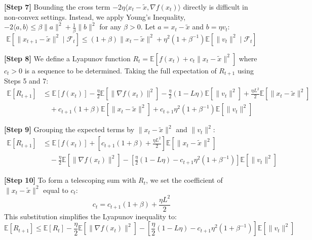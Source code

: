 \documentclass[11pt]{article}
\begin{document}
\textbf{[Step 7]} Bounding the cross term $-2\eta \langle x_t - \tilde{x}, \nabla f(x_t) \rangle$ directly is difficult in non-convex settings. Instead, we apply Young's Inequality, $-2\langle a, b \rangle \le \beta \|a\|^2 + \frac{1}{\beta} \|b\|^2$ for any $\beta > 0$. Let $a = x_t - \tilde{x}$ and $b = \eta v_t$:
\begin{equation} \tag{Step 7}
    \mathbb{E}[\|x_{t+1} - \tilde{x}\|^2 \mid \mathcal{F}_t] \le (1 + \beta) \|x_t - \tilde{x}\|^2 + \eta^2 (1 + \beta^{-1}) \mathbb{E}[\|v_t\|^2 \mid \mathcal{F}_t]
\end{equation}

\textbf{[Step 8]} We define a Lyapunov function $R_t = \mathbb{E}[f(x_t) + c_t \|x_t - \tilde{x}\|^2]$ where $c_t > 0$ is a sequence to be determined. Taking the full expectation of $R_{t+1}$ using Steps 5 and 7:
\begin{align} 
    \mathbb{E}[R_{t+1}] &\le \mathbb{E}[f(x_t)] - \frac{\eta}{2} \mathbb{E}[\|\nabla f(x_t)\|^2] - \frac{\eta}{2}(1 - L\eta) \mathbb{E}[\|v_t\|^2] + \frac{\eta L^2}{2} \mathbb{E}[\|x_t - \tilde{x}\|^2] \nonumber \\
    &\quad + c_{t+1}(1 + \beta) \mathbb{E}[\|x_t - \tilde{x}\|^2] + c_{t+1}\eta^2 (1 + \beta^{-1}) \mathbb{E}[\|v_t\|^2] \tag{Step 8}
\end{align}

\textbf{[Step 9]} Grouping the expected terms by $\|x_t - \tilde{x}\|^2$ and $\|v_t\|^2$:
\begin{align} 
    \mathbb{E}[R_{t+1}] &\le \mathbb{E}[f(x_t)] + \left[ c_{t+1}(1 + \beta) + \frac{\eta L^2}{2} \right] \mathbb{E}[\|x_t - \tilde{x}\|^2] \nonumber \\
    &\quad - \frac{\eta}{2} \mathbb{E}[\|\nabla f(x_t)\|^2] - \left[ \frac{\eta}{2}(1 - L\eta) - c_{t+1}\eta^2(1 + \beta^{-1}) \right] \mathbb{E}[\|v_t\|^2] \tag{Step 9}
\end{align}

\textbf{[Step 10]} To form a telescoping sum with $R_t$, we set the coefficient of $\|x_t - \tilde{x}\|^2$ equal to $c_t$:
\begin{equation} \tag{Step 10}
    c_t = c_{t+1}(1 + \beta) + \frac{\eta L^2}{2}
\end{equation}
This substitution simplifies the Lyapunov inequality to:
\begin{equation*}
    \mathbb{E}[R_{t+1}] \le \mathbb{E}[R_t] - \frac{\eta}{2} \mathbb{E}[\|\nabla f(x_t)\|^2] - \left[ \frac{\eta}{2}(1 - L\eta) - c_{t+1}\eta^2(1 + \beta^{-1}) \right] \mathbb{E}[\|v_t\|^2]
\end{equation*}
\end{document}
